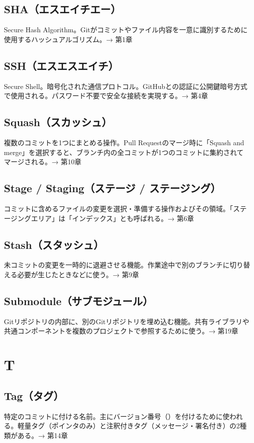 \subsection*{SHA（エスエイチエー）}
Secure Hash Algorithm。Gitがコミットやファイル内容を一意に識別するために使用するハッシュアルゴリズム。→ 第1章

\subsection*{SSH（エスエスエイチ）}
Secure Shell。暗号化された通信プロトコル。GitHubとの認証に公開鍵暗号方式で使用される。パスワード不要で安全な接続を実現する。→ 第4章

\subsection*{Squash（スカッシュ）}
複数のコミットを1つにまとめる操作。Pull Requestのマージ時に「Squash and merge」を選択すると、ブランチ内の全コミットが1つのコミットに集約されてマージされる。→ 第10章

\subsection*{Stage / Staging（ステージ / ステージング）}
コミットに含めるファイルの変更を選択・準備する操作およびその領域。「ステージングエリア」は「インデックス」とも呼ばれる。→ 第6章

\subsection*{Stash（スタッシュ）}
未コミットの変更を一時的に退避させる機能。作業途中で別のブランチに切り替える必要が生じたときなどに使う。→ 第9章

\subsection*{Submodule（サブモジュール）}
Gitリポジトリの内部に、別のGitリポジトリを埋め込む機能。共有ライブラリや共通コンポーネントを複数のプロジェクトで参照するために使う。→ 第19章

\section*{T}

\subsection*{Tag（タグ）}
特定のコミットに付ける名前。主にバージョン番号（）を付けるために使われる。軽量タグ（ポインタのみ）と注釈付きタグ（メッセージ・署名付き）の2種類がある。→ 第14章

